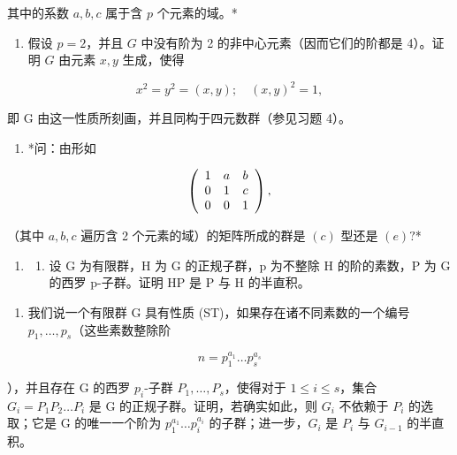 其中的系数 \(a, b, c\) 属于含 \(p\) 个元素的域。*

\begin{enumerate}
\def\labelenumi{(\alph{enumi})}
\setcounter{enumi}{4}
\tightlist
\item
  假设 \(p = 2\)，并且 \(G\) 中没有阶为 2 的非中心元素（因而它们的阶都是 4）。证明 \(G\) 由元素 \(x, y\) 生成，使得
\end{enumerate}

\[
x ^ {2} = y ^ {2} = (x, y); \quad (x, y) ^ {2} = 1,
\]

即 G 由这一性质所刻画，并且同构于四元数群（参见习题 4）。

\begin{enumerate}
\def\labelenumi{(\alph{enumi})}
\setcounter{enumi}{5}
\tightlist
\item
  *问：由形如
\end{enumerate}

\[
\left( \begin{array}{c c c} 1 & a & b \\ 0 & 1 & c \\ 0 & 0 & 1 \end{array} \right),
\]

（其中 \(a, b, c\) 遍历含 2 个元素的域）的矩阵所成的群是 \((c)\) 型还是 \((e)?\)*

\begin{enumerate}
\def\labelenumi{\arabic{enumi}。}
\setcounter{enumi}{36}
\tightlist
\item
  \begin{enumerate}
  \def\labelenumii{(\alph{enumii})}
  \tightlist
  \item
    设 G 为有限群，H 为 G 的正规子群，p 为不整除 H 的阶的素数，P 为 G 的西罗 p-子群。证明 HP 是 P 与 H 的半直积。
  \end{enumerate}
\end{enumerate}

\begin{enumerate}
\def\labelenumi{(\alph{enumi})}
\setcounter{enumi}{1}
\tightlist
\item
  我们说一个有限群 G 具有性质 (ST)，如果存在诸不同素数的一个编号 \(p_{1}, \ldots, p_{s}\)（这些素数整除阶
\end{enumerate}

\[
n = p _ {1} ^ {a _ {1}} \dots p _ {s} ^ {a _ {s}}
\]

），并且存在 G 的西罗 \(p_i\)-子群 \(P_1, \ldots, P_s\)，使得对于 \(1 \leqslant i \leqslant s\)，集合 \(G_i = P_1P_2 \ldots P_i\) 是 G 的正规子群。证明，若确实如此，则 \(G_i\) 不依赖于 \(P_i\) 的选取；它是 G 的唯一一个阶为 \(p_1^{a_1} \ldots p_i^{a_i}\) 的子群；进一步，\(G_i\) 是 \(P_i\) 与 \(G_{i-1}\) 的半直积。

